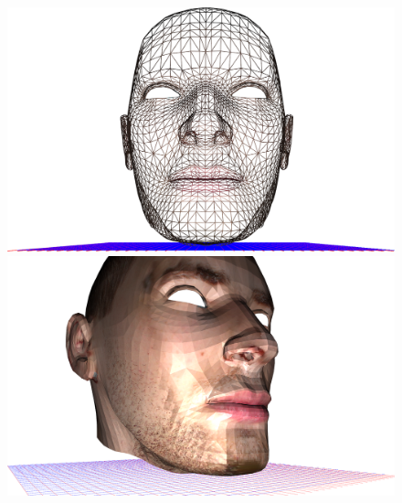 \documentclass{article}
\begin{document}
\vfill
\begin{figure}[H]
    \centering
    \begin{minipage}{.5\textwidth}
        \centering
        \includegraphics[width=\linewidth]{pic_3.png}
    \end{minipage}%
    \begin{minipage}{.5\textwidth}
        \centering
        \includegraphics[width=\linewidth]{pic_2.png}
    \end{minipage}

    \vspace{1in}


\end{figure}
\end{document}
